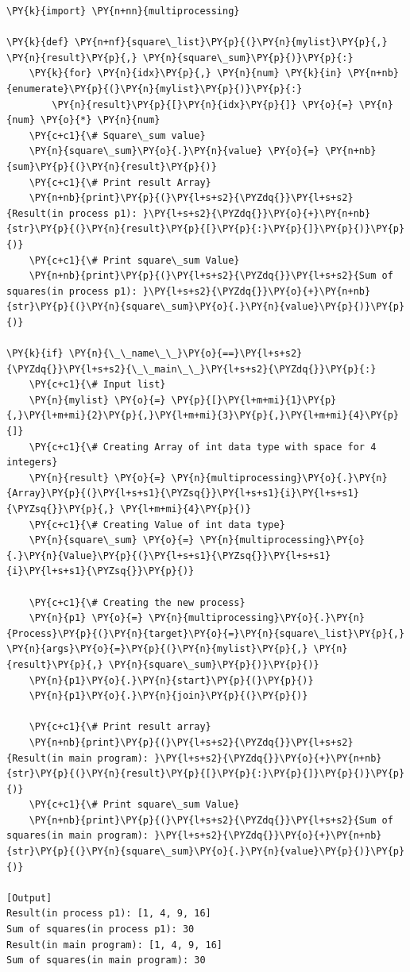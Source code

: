 \begin{Verbatim}[label=\makebox{\url{https://github.com/lucabaldini/cmepda/tree/master/slides/latex/snippets/multiprocessing_shared_memory.py}},commandchars=\\\{\}]
\PY{k}{import} \PY{n+nn}{multiprocessing}

\PY{k}{def} \PY{n+nf}{square\_list}\PY{p}{(}\PY{n}{mylist}\PY{p}{,} \PY{n}{result}\PY{p}{,} \PY{n}{square\_sum}\PY{p}{)}\PY{p}{:}
    \PY{k}{for} \PY{n}{idx}\PY{p}{,} \PY{n}{num} \PY{k}{in} \PY{n+nb}{enumerate}\PY{p}{(}\PY{n}{mylist}\PY{p}{)}\PY{p}{:}
        \PY{n}{result}\PY{p}{[}\PY{n}{idx}\PY{p}{]} \PY{o}{=} \PY{n}{num} \PY{o}{*} \PY{n}{num}
    \PY{c+c1}{\# Square\_sum value}
    \PY{n}{square\_sum}\PY{o}{.}\PY{n}{value} \PY{o}{=} \PY{n+nb}{sum}\PY{p}{(}\PY{n}{result}\PY{p}{)}
    \PY{c+c1}{\# Print result Array}
    \PY{n+nb}{print}\PY{p}{(}\PY{l+s+s2}{\PYZdq{}}\PY{l+s+s2}{Result(in process p1): }\PY{l+s+s2}{\PYZdq{}}\PY{o}{+}\PY{n+nb}{str}\PY{p}{(}\PY{n}{result}\PY{p}{[}\PY{p}{:}\PY{p}{]}\PY{p}{)}\PY{p}{)}
    \PY{c+c1}{\# Print square\_sum Value}
    \PY{n+nb}{print}\PY{p}{(}\PY{l+s+s2}{\PYZdq{}}\PY{l+s+s2}{Sum of squares(in process p1): }\PY{l+s+s2}{\PYZdq{}}\PY{o}{+}\PY{n+nb}{str}\PY{p}{(}\PY{n}{square\_sum}\PY{o}{.}\PY{n}{value}\PY{p}{)}\PY{p}{)}

\PY{k}{if} \PY{n}{\_\_name\_\_}\PY{o}{==}\PY{l+s+s2}{\PYZdq{}}\PY{l+s+s2}{\_\_main\_\_}\PY{l+s+s2}{\PYZdq{}}\PY{p}{:}
    \PY{c+c1}{\# Input list}
    \PY{n}{mylist} \PY{o}{=} \PY{p}{[}\PY{l+m+mi}{1}\PY{p}{,}\PY{l+m+mi}{2}\PY{p}{,}\PY{l+m+mi}{3}\PY{p}{,}\PY{l+m+mi}{4}\PY{p}{]}
    \PY{c+c1}{\# Creating Array of int data type with space for 4 integers}
    \PY{n}{result} \PY{o}{=} \PY{n}{multiprocessing}\PY{o}{.}\PY{n}{Array}\PY{p}{(}\PY{l+s+s1}{\PYZsq{}}\PY{l+s+s1}{i}\PY{l+s+s1}{\PYZsq{}}\PY{p}{,} \PY{l+m+mi}{4}\PY{p}{)}
    \PY{c+c1}{\# Creating Value of int data type}
    \PY{n}{square\_sum} \PY{o}{=} \PY{n}{multiprocessing}\PY{o}{.}\PY{n}{Value}\PY{p}{(}\PY{l+s+s1}{\PYZsq{}}\PY{l+s+s1}{i}\PY{l+s+s1}{\PYZsq{}}\PY{p}{)}

    \PY{c+c1}{\# Creating the new process}
    \PY{n}{p1} \PY{o}{=} \PY{n}{multiprocessing}\PY{o}{.}\PY{n}{Process}\PY{p}{(}\PY{n}{target}\PY{o}{=}\PY{n}{square\_list}\PY{p}{,} \PY{n}{args}\PY{o}{=}\PY{p}{(}\PY{n}{mylist}\PY{p}{,} \PY{n}{result}\PY{p}{,} \PY{n}{square\_sum}\PY{p}{)}\PY{p}{)}
    \PY{n}{p1}\PY{o}{.}\PY{n}{start}\PY{p}{(}\PY{p}{)}
    \PY{n}{p1}\PY{o}{.}\PY{n}{join}\PY{p}{(}\PY{p}{)}

    \PY{c+c1}{\# Print result array}
    \PY{n+nb}{print}\PY{p}{(}\PY{l+s+s2}{\PYZdq{}}\PY{l+s+s2}{Result(in main program): }\PY{l+s+s2}{\PYZdq{}}\PY{o}{+}\PY{n+nb}{str}\PY{p}{(}\PY{n}{result}\PY{p}{[}\PY{p}{:}\PY{p}{]}\PY{p}{)}\PY{p}{)}
    \PY{c+c1}{\# Print square\_sum Value}
    \PY{n+nb}{print}\PY{p}{(}\PY{l+s+s2}{\PYZdq{}}\PY{l+s+s2}{Sum of squares(in main program): }\PY{l+s+s2}{\PYZdq{}}\PY{o}{+}\PY{n+nb}{str}\PY{p}{(}\PY{n}{square\_sum}\PY{o}{.}\PY{n}{value}\PY{p}{)}\PY{p}{)}

[Output]
Result(in process p1): [1, 4, 9, 16]
Sum of squares(in process p1): 30
Result(in main program): [1, 4, 9, 16]
Sum of squares(in main program): 30
\end{Verbatim}
